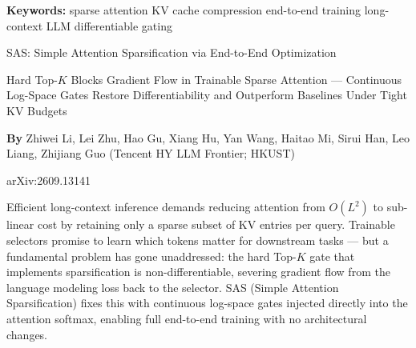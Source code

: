 \documentclass[10pt,twocolumn]{article}
\begin{document}
\setlength{\parindent}{0pt}
\setlength{\parskip}{4pt}

{\small\color{keywordgray}\textbf{Keywords:}
  sparse attention \textbullet{}
  KV cache compression \textbullet{}
  end-to-end training \textbullet{}
  long-context LLM \textbullet{}
  differentiable gating}\par\vspace{4pt}

{\LARGE\bfseries\raggedright
  SAS: Simple Attention Sparsification
  via End-to-End Optimization}\par\vspace{4pt}

{\large\itshape\raggedright
  Hard Top-$K$ Blocks Gradient Flow in Trainable Sparse Attention ---
  Continuous Log-Space Gates Restore Differentiability and
  Outperform Baselines Under Tight KV Budgets}\par\vspace{6pt}

{\small\textbf{By} Zhiwei Li, Lei Zhu, Hao Gu, Xiang Hu, Yan Wang,
  Haitao Mi, Sirui Han, Leo Liang, Zhijiang Guo
  (Tencent HY LLM Frontier; HKUST)}\par\vspace{2pt}

{\small\color{keywordgray}arXiv:2609.13141}
\par\vspace{2pt}\noindent{\color{rulered}\rule{\columnwidth}{0.6pt}}\vspace{6pt}

Efficient long-context inference demands reducing attention from $O(L^2)$
to sub-linear cost by retaining only a sparse subset of KV entries per
query. Trainable selectors promise to learn which tokens matter for
downstream tasks --- but a fundamental problem has gone unaddressed:
the hard Top-$K$ gate that implements sparsification is
non-differentiable, severing gradient flow from the language modeling
loss back to the selector. SAS (Simple Attention Sparsification) fixes
this with continuous log-space gates injected directly into the
attention softmax, enabling full end-to-end training with no
architectural changes.
\end{document}
